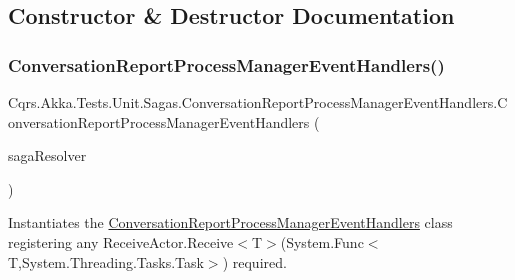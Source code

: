 \subsection{Constructor \& Destructor Documentation}
\mbox{\label{classCqrs_1_1Akka_1_1Tests_1_1Unit_1_1Sagas_1_1ConversationReportProcessManagerEventHandlers_a0b35d652189d6194ff5893ff114293e0_a0b35d652189d6194ff5893ff114293e0}} 
\subsubsection{\texorpdfstring{Conversation\+Report\+Process\+Manager\+Event\+Handlers()}{ConversationReportProcessManagerEventHandlers()}}
{\footnotesize\ttfamily Cqrs.\+Akka.\+Tests.\+Unit.\+Sagas.\+Conversation\+Report\+Process\+Manager\+Event\+Handlers.\+Conversation\+Report\+Process\+Manager\+Event\+Handlers (\begin{DoxyParamCaption}\item[{\hyperlink{interfaceCqrs_1_1Akka_1_1Domain_1_1IAkkaSagaResolver}{I\+Akka\+Saga\+Resolver}}]{saga\+Resolver }\end{DoxyParamCaption})}



Instantiates the \hyperlink{classCqrs_1_1Akka_1_1Tests_1_1Unit_1_1Sagas_1_1ConversationReportProcessManagerEventHandlers}{Conversation\+Report\+Process\+Manager\+Event\+Handlers} class registering any Receive\+Actor.\+Receive$<$\+T$>$(\+System.\+Func$<$\+T,\+System.\+Threading.\+Tasks.\+Task$>$) required. 



